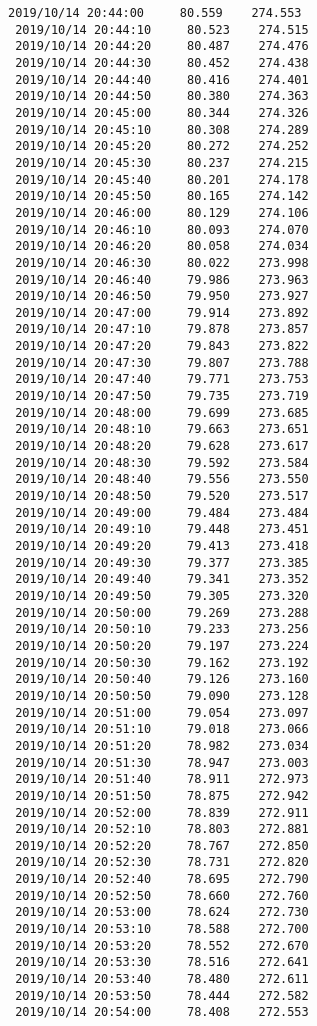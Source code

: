 \documentclass[11pt]{article}
\begin{document}
\begin{Verbatim}[commandchars=\\\{\}]
 2019/10/14 20:44:00     80.559    274.553
 2019/10/14 20:44:10     80.523    274.515
 2019/10/14 20:44:20     80.487    274.476
 2019/10/14 20:44:30     80.452    274.438
 2019/10/14 20:44:40     80.416    274.401
 2019/10/14 20:44:50     80.380    274.363
 2019/10/14 20:45:00     80.344    274.326
 2019/10/14 20:45:10     80.308    274.289
 2019/10/14 20:45:20     80.272    274.252
 2019/10/14 20:45:30     80.237    274.215
 2019/10/14 20:45:40     80.201    274.178
 2019/10/14 20:45:50     80.165    274.142
 2019/10/14 20:46:00     80.129    274.106
 2019/10/14 20:46:10     80.093    274.070
 2019/10/14 20:46:20     80.058    274.034
 2019/10/14 20:46:30     80.022    273.998
 2019/10/14 20:46:40     79.986    273.963
 2019/10/14 20:46:50     79.950    273.927
 2019/10/14 20:47:00     79.914    273.892
 2019/10/14 20:47:10     79.878    273.857
 2019/10/14 20:47:20     79.843    273.822
 2019/10/14 20:47:30     79.807    273.788
 2019/10/14 20:47:40     79.771    273.753
 2019/10/14 20:47:50     79.735    273.719
 2019/10/14 20:48:00     79.699    273.685
 2019/10/14 20:48:10     79.663    273.651
 2019/10/14 20:48:20     79.628    273.617
 2019/10/14 20:48:30     79.592    273.584
 2019/10/14 20:48:40     79.556    273.550
 2019/10/14 20:48:50     79.520    273.517
 2019/10/14 20:49:00     79.484    273.484
 2019/10/14 20:49:10     79.448    273.451
 2019/10/14 20:49:20     79.413    273.418
 2019/10/14 20:49:30     79.377    273.385
 2019/10/14 20:49:40     79.341    273.352
 2019/10/14 20:49:50     79.305    273.320
 2019/10/14 20:50:00     79.269    273.288
 2019/10/14 20:50:10     79.233    273.256
 2019/10/14 20:50:20     79.197    273.224
 2019/10/14 20:50:30     79.162    273.192
 2019/10/14 20:50:40     79.126    273.160
 2019/10/14 20:50:50     79.090    273.128
 2019/10/14 20:51:00     79.054    273.097
 2019/10/14 20:51:10     79.018    273.066
 2019/10/14 20:51:20     78.982    273.034
 2019/10/14 20:51:30     78.947    273.003
 2019/10/14 20:51:40     78.911    272.973
 2019/10/14 20:51:50     78.875    272.942
 2019/10/14 20:52:00     78.839    272.911
 2019/10/14 20:52:10     78.803    272.881
 2019/10/14 20:52:20     78.767    272.850
 2019/10/14 20:52:30     78.731    272.820
 2019/10/14 20:52:40     78.695    272.790
 2019/10/14 20:52:50     78.660    272.760
 2019/10/14 20:53:00     78.624    272.730
 2019/10/14 20:53:10     78.588    272.700
 2019/10/14 20:53:20     78.552    272.670
 2019/10/14 20:53:30     78.516    272.641
 2019/10/14 20:53:40     78.480    272.611
 2019/10/14 20:53:50     78.444    272.582
 2019/10/14 20:54:00     78.408    272.553

\end{Verbatim}
\end{document}
